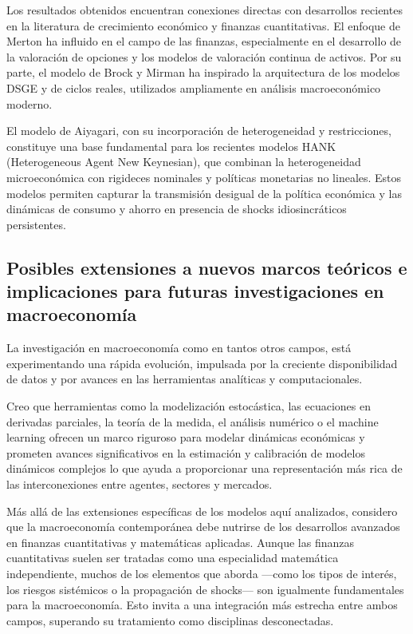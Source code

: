 \documentclass[a4paper,12pt]{article}
\begin{document}
Los resultados obtenidos encuentran conexiones directas con desarrollos recientes en la literatura de crecimiento económico y finanzas cuantitativas. El enfoque de Merton ha influido en el campo de las finanzas, especialmente en el desarrollo de la valoración de opciones y los modelos de valoración continua de activos. Por su parte, el modelo de Brock y Mirman ha inspirado la arquitectura de los modelos DSGE y de ciclos reales, utilizados ampliamente en análisis macroeconómico moderno.

El modelo de Aiyagari, con su incorporación de heterogeneidad y restricciones, constituye una base fundamental para los recientes modelos HANK (Heterogeneous Agent New Keynesian), que combinan la heterogeneidad microeconómica con rigideces nominales y políticas monetarias no lineales. Estos modelos permiten capturar la transmisión desigual de la política económica y las dinámicas de consumo y ahorro en presencia de shocks idiosincráticos persistentes.

\subsection{Posibles extensiones a nuevos marcos teóricos e implicaciones para futuras investigaciones en macroeconomía}


La investigación en macroeconomía como en tantos otros campos, está experimentando una rápida evolución, impulsada por la creciente disponibilidad de datos y por avances en las herramientas analíticas y computacionales. 

Creo que herramientas como la modelización estocástica, las ecuaciones en derivadas parciales, la teoría de la medida, el análisis numérico o el machine learning ofrecen un marco riguroso para modelar dinámicas económicas y prometen avances significativos en la estimación y calibración de modelos dinámicos complejos lo que ayuda a proporcionar una representación más rica de las interconexiones entre agentes, sectores y mercados.

Más allá de las extensiones específicas de los modelos aquí analizados, considero que la macroeconomía contemporánea debe nutrirse de los desarrollos avanzados en finanzas cuantitativas y matemáticas aplicadas. Aunque las finanzas cuantitativas suelen ser tratadas como una especialidad matemática independiente, muchos de los elementos que aborda —como los tipos de interés, los riesgos sistémicos o la propagación de shocks— son igualmente fundamentales para la macroeconomía. Esto invita a una integración más estrecha entre ambos campos, superando su tratamiento como disciplinas desconectadas.
\end{document}
